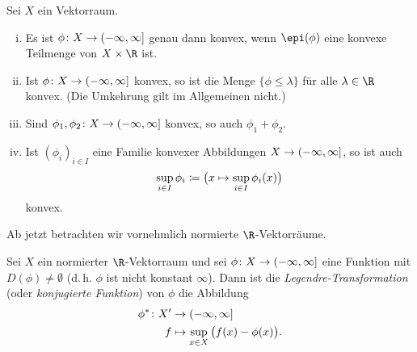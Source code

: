 \pagebreak[2]
\begin{thLemma} \label{vl07:lemma4.27}
    Sei $X$ ein Vektorraum.
    \begin{enumerate}[(i)]
        \item \label{vl07:lemma4.27:i}
            Es ist $\phi\colon X\to(-\infty,\infty]$ genau dann konvex, wenn
            $\epi(\phi)$ eine konvexe Teilmenge von $X\times\R$ ist.
            
        \item \label{vl07:lemma4.27:ii}
            Ist $\phi\colon X\to(-\infty,\infty]$ konvex, so ist die Menge 
            $\{ \phi\leq\lambda \}$ für alle $\lambda\in\R$ konvex. 
            (Die Umkehrung gilt im Allgemeinen nicht.)
            
        \item \label{vl07:lemma4.27:iii}
            Sind $\phi_1,\phi_2\colon X\to(-\infty,\infty]$ konvex, so auch
            $\phi_1+\phi_2$.
            
        \item \label{vl07:lemma4.27:iv}
            Ist $(\phi_i)_{i\in I}$ eine Familie konvexer Abbildungen
            $X\to(-\infty,\infty]$, so ist auch 
            \[ \sup_{i\in I} \phi_i 
                \coloneqq \bigl(x\mapsto \sup_{i\in I} \phi_i(x)\bigr)
            \]
            konvex.
    \end{enumerate}
\end{thLemma}

Ab jetzt betrachten wir vornehmlich normierte $\R$-Vektorräume.

\begin{thDef}
    Sei $X$ ein normierter $\R$-Vektorraum und sei 
    $\phi\colon X\to(-\infty,\infty]$ eine Funktion mit $D(\phi)\neq\emptyset$
    (d.\,h. $\phi$ ist nicht konstant $\infty$).
    Dann ist die \emph{Legendre-Transformation} (oder \emph{konjugierte
    Funktion}) von $\phi$ die Abbildung
    \begin{align*}
        \phi^\ast\colon X' &\to (-\infty,\infty]    \\
        f &\mapsto \sup_{x\in X} \, \bigl( f(x) - \phi(x) \bigr)
    . \end{align*}
\end{thDef}

